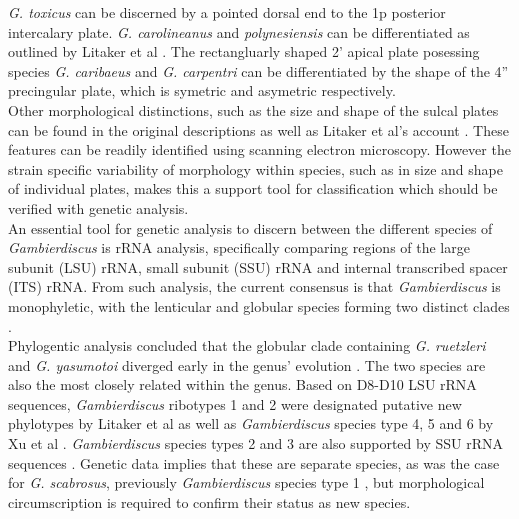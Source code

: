 \documentclass[12pt]{article}
\begin{document}
\emph{G. toxicus} can be discerned by a pointed dorsal end to the 1p posterior intercalary plate. \emph{G. carolineanus} and \emph{polynesiensis} can be differentiated as outlined by Litaker et al \cite{litaker2009taxonomy}. The rectangluarly shaped 2' apical plate posessing species \emph{G. caribaeus} and \emph{G. carpentri} can be differentiated by the shape of the 4'' precingular plate, which is symetric and asymetric respectively. \\
Other morphological distinctions, such as the size and shape of the sulcal plates can be found in the original descriptions as well as Litaker et al's account \cite{litaker2009taxonomy,fraga2011gambierdiscus,faust1995observation,holmes1998gambierdiscus,chinain1999morphology}. %
These features can be readily identified using scanning electron microscopy. However the strain specific variability of morphology within species, such as in size and shape of individual plates, makes this a support tool for classification which should be verified with genetic analysis. \\

An essential tool for genetic analysis to discern between the different species of \emph{Gambierdiscus} is rRNA analysis, specifically comparing regions of the large subunit (LSU) rRNA, small subunit (SSU) rRNA and internal transcribed spacer (ITS) rRNA. From such analysis, the current consensus is that \emph{Gambierdiscus} is monophyletic, with the lenticular and globular species forming two distinct clades \cite{chinain1999morphology,litaker2009taxonomy,fraga2011gambierdiscus,richlen2008phylogeography,kuno2010genetic,litaker2010global,nishimura2013genetic}. \\
Phylogentic analysis concluded that the globular clade containing \emph{G. ruetzleri} and \emph{G. yasumotoi} diverged early in the genus' evolution \cite{litaker2009taxonomy,nishimura2013genetic}. The two species are also the most closely related within the genus. 
Based on D8-D10 LSU rRNA sequences, \emph{Gambierdiscus} ribotypes 1 and 2 were designated putative new phylotypes by Litaker et al as well as \emph{Gambierdiscus} species type 4, 5 and 6 by Xu et al \cite{litaker2010global,xu2014distribution}. \emph{Gambierdiscus} species types 2 and 3 are also supported by SSU rRNA sequences \cite{nishimura2013genetic,kuno2010genetic}. Genetic data implies that these are separate species, as was the case for \emph{G. scabrosus}, previously \emph{Gambierdiscus} species type 1 \cite{nishimura2013genetic,nishimura2014morphology}, but morphological circumscription is required to confirm their status as new species.
\end{document}
